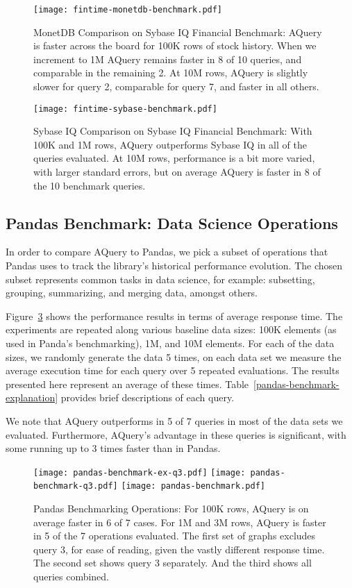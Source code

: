 \documentclass{acm_proc_article-sp}
\begin{document}
\begin{figure}
\texttt{[image: fintime-monetdb-benchmark.pdf]}
\caption{MonetDB Comparison on Sybase IQ Financial Benchmark: AQuery is faster across the board
for 100K rows of stock history. When we increment to 1M AQuery remains faster in 8 of 10 queries, and comparable
in the remaining 2. At 10M rows, AQuery is slightly slower for query 2, comparable for query 7, and faster in all others.}
\label{fintime-monetdb-benchmark}
\end{figure}

\begin{figure}
\texttt{[image: fintime-sybase-benchmark.pdf]}
\caption{Sybase IQ Comparison on Sybase IQ Financial Benchmark: With 100K and 1M rows, AQuery
outperforms Sybase IQ in all of the queries evaluated. At 10M rows, performance is a bit more varied, with
larger standard errors, but on average AQuery is faster in 8 of the 10 benchmark queries.}
\label{fintime-sybase-benchmark}
\end{figure}


\subsection{Pandas Benchmark: Data Science Operations}
In order to compare AQuery to Pandas, we pick a subset of operations that Pandas uses to track the library's
historical performance evolution\cite{pandas-vbench}. The chosen subset represents common tasks in data science, for example: subsetting, grouping, summarizing, and merging data, amongst others.

Figure~\ref{pandas-benchmark} shows the performance results in terms of average response time. The experiments are repeated along various baseline data sizes: 100K elements (as used in Panda's benchmarking),
1M, and 10M elements. For each of the data sizes, we randomly generate the data 5 times, on each data
set we measure the average execution time for each query over 5 repeated evaluations. The results presented here represent an average of these times. Table~\ref{pandas-benchmark-explanation} provides brief descriptions of each query. 

We note that AQuery outperforms in 5 of 7 queries in most of the data sets we evaluated. Furthermore, AQuery's advantage in these queries is significant, with some running up to 3 times faster than in Pandas.


\begin{figure}
\texttt{[image: pandas-benchmark-ex-q3.pdf]}
\texttt{[image: pandas-benchmark-q3.pdf]}
\texttt{[image: pandas-benchmark.pdf]}
\caption{Pandas Benchmarking Operations: For 100K rows, AQuery is on average faster in 6 of 7 cases. For 1M and 3M rows, AQuery is faster in 5 of the 7 operations evaluated. The first set of graphs excludes query 3, 
for ease of reading, given the vastly different response time. The second set shows query 3 separately. And the third shows all queries combined.}
\label{pandas-benchmark}
\end{figure}
\end{document}
